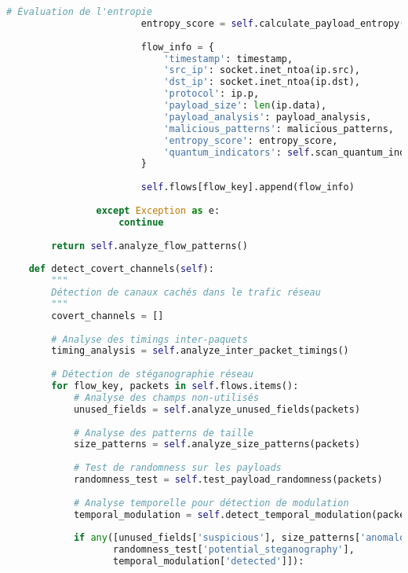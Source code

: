 \begin{lstlisting}[language=Python, caption=Système de capture PCAP avec validation d'intégrité]
                        # Évaluation de l'entropie
                        entropy_score = self.calculate_payload_entropy(ip.data)
                        
                        flow_info = {
                            'timestamp': timestamp,
                            'src_ip': socket.inet_ntoa(ip.src),
                            'dst_ip': socket.inet_ntoa(ip.dst),
                            'protocol': ip.p,
                            'payload_size': len(ip.data),
                            'payload_analysis': payload_analysis,
                            'malicious_patterns': malicious_patterns,
                            'entropy_score': entropy_score,
                            'quantum_indicators': self.scan_quantum_indicators(ip.data)
                        }
                        
                        self.flows[flow_key].append(flow_info)
                        
                except Exception as e:
                    continue
                    
        return self.analyze_flow_patterns()
    
    def detect_covert_channels(self):
        """
        Détection de canaux cachés dans le trafic réseau
        """
        covert_channels = []
        
        # Analyse des timings inter-paquets
        timing_analysis = self.analyze_inter_packet_timings()
        
        # Détection de stéganographie réseau
        for flow_key, packets in self.flows.items():
            # Analyse des champs non-utilisés
            unused_fields = self.analyze_unused_fields(packets)
            
            # Analyse des patterns de taille
            size_patterns = self.analyze_size_patterns(packets)
            
            # Test de randomness sur les payloads
            randomness_test = self.test_payload_randomness(packets)
            
            # Analyse temporelle pour détection de modulation
            temporal_modulation = self.detect_temporal_modulation(packets)
            
            if any([unused_fields['suspicious'], size_patterns['anomalous'], 
                   randomness_test['potential_steganography'], 
                   temporal_modulation['detected']]):
                

\end{lstlisting}

